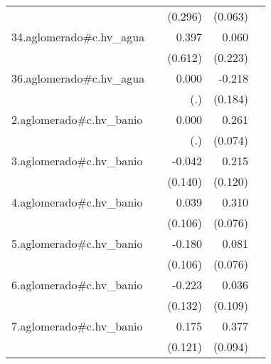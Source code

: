 {\begin{longtable}{l*{4}{D{.}{.}{-1}}}
            &                     &     (0.296)         &     (0.063)         &                     \\
\addlinespace
34.aglomerado#c.hv\_agua&                     &       0.397         &       0.060         &                     \\
            &                     &     (0.612)         &     (0.223)         &                     \\
\addlinespace
36.aglomerado#c.hv\_agua&                     &       0.000         &      -0.218         &                     \\
            &                     &         (.)         &     (0.184)         &                     \\
\addlinespace
2.aglomerado#c.hv\_banio&                     &       0.000         &       0.261\sym{***}&                     \\
            &                     &         (.)         &     (0.074)         &                     \\
\addlinespace
3.aglomerado#c.hv\_banio&                     &      -0.042         &       0.215         &                     \\
            &                     &     (0.140)         &     (0.120)         &                     \\
\addlinespace
4.aglomerado#c.hv\_banio&                     &       0.039         &       0.310\sym{***}&                     \\
            &                     &     (0.106)         &     (0.076)         &                     \\
\addlinespace
5.aglomerado#c.hv\_banio&                     &      -0.180         &       0.081         &                     \\
            &                     &     (0.106)         &     (0.076)         &                     \\
\addlinespace
6.aglomerado#c.hv\_banio&                     &      -0.223         &       0.036         &                     \\
            &                     &     (0.132)         &     (0.109)         &                     \\
\addlinespace
7.aglomerado#c.hv\_banio&                     &       0.175         &       0.377\sym{***}&                     \\
            &                     &     (0.121)         &     (0.094)         &                     \\

\end{longtable}}
